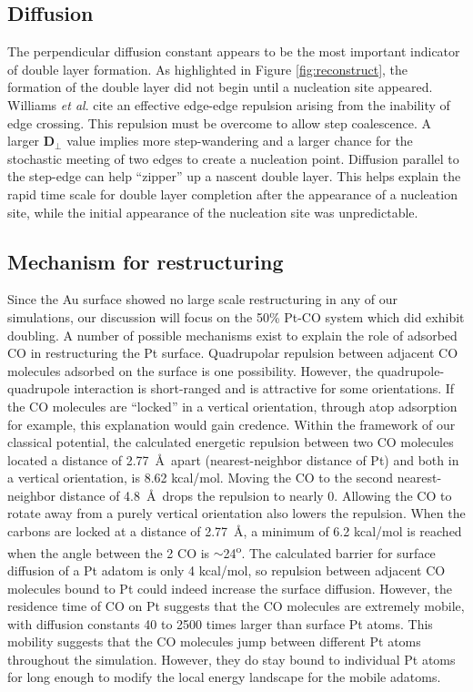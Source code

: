 \subsection{Diffusion}
The perpendicular diffusion constant appears to be the most important
indicator of double layer formation. As highlighted in Figure
\ref{fig:reconstruct}, the formation of the double layer did not begin
until a nucleation site appeared.  Williams {\it et
  al}.\citep{Williams:1991qd, Williams:1994aa} cite an effective edge-edge
repulsion arising from the inability of edge crossing.  This repulsion
must be overcome to allow step coalescence.  A larger
$\textbf{D}_\perp$ value implies more step-wandering and a larger
chance for the stochastic meeting of two edges to create a nucleation
point.  Diffusion parallel to the step-edge can help ``zipper'' up a
nascent double layer. This helps explain the rapid time scale for
double layer completion after the appearance of a nucleation site, while
the initial appearance of the nucleation site was unpredictable.

\subsection{Mechanism for restructuring}
Since the Au surface showed no large scale restructuring in any of our
simulations, our discussion will focus on the 50\% Pt-CO system which
did exhibit doubling. A number of possible mechanisms exist to explain
the role of adsorbed CO in restructuring the Pt surface. Quadrupolar
repulsion between adjacent CO molecules adsorbed on the surface is one
possibility.  However, the quadrupole-quadrupole interaction is
short-ranged and is attractive for some orientations.  If the CO
molecules are ``locked'' in a vertical orientation, through atop
adsorption for example, this explanation would gain credence. Within
the framework of our classical potential, the calculated energetic
repulsion between two CO molecules located a distance of
2.77~\AA~apart (nearest-neighbor distance of Pt) and both in a
vertical orientation, is 8.62 kcal/mol. Moving the CO to the second
nearest-neighbor distance of 4.8~\AA~drops the repulsion to nearly
0. Allowing the CO to rotate away from a purely vertical orientation
also lowers the repulsion. When the carbons are locked at a distance
of 2.77~\AA, a minimum of 6.2 kcal/mol is reached when the angle
between the 2 CO is $\sim$24\textsuperscript{o}.  The calculated
barrier for surface diffusion of a Pt adatom is only 4 kcal/mol, so
repulsion between adjacent CO molecules bound to Pt could indeed
increase the surface diffusion. However, the residence time of CO on
Pt suggests that the CO molecules are extremely mobile, with diffusion
constants 40 to 2500 times larger than surface Pt atoms. This mobility
suggests that the CO molecules jump between different Pt atoms
throughout the simulation.  However, they do stay bound to individual
Pt atoms for long enough to modify the local energy landscape for the
mobile adatoms.

